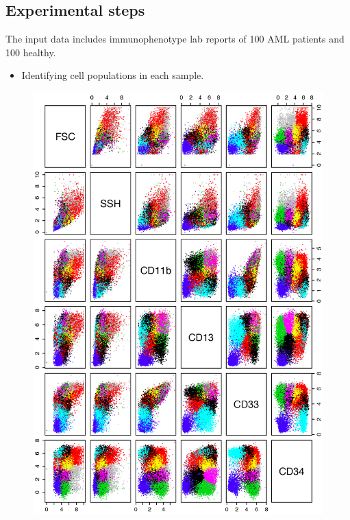 \documentclass[landscape]{sciposter}
\begin{document}
\begin{multicols}{5}
\section*{Experimental steps}
The input data includes immunophenotype lab reports of 100 AML patients and 100 healthy.
\begin{itemize}
\item Identifying cell populations in each sample.
\end{itemize}
\vspace*{-0.5cm}
\begin{figure}[h]
\centering
\includegraphics[width=\textwidth]{images/sample-labeled-tube9.png}

\end{figure}
\end{multicols}
\end{document}
